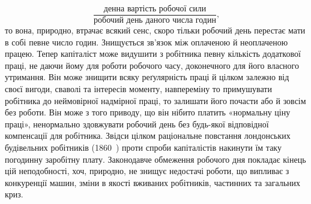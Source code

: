 \[
\frac{\text{денна вартість робочої сили}}{\text{робочий день даного числа годин}}
\text{,}
\]
\noindent{}то вона, природно, втрачає всякий сенс, скоро тільки робочий
день перестає мати в собі певне число годин. Знищується зв’язок
між оплаченою й неоплаченою працею. Тепер капіталіст може
видушити з робітника певну кількість додаткової праці, не даючи
йому для роботи робочого часу, доконечного для його власного
утримання. Він може знищити всяку реґулярність праці й цілком
залежно від своєї вигоди, сваволі та інтересів моменту, навпереміну
то примушувати робітника до неймовірної надмірної
праці, то залишати його почасти або й зовсім без роботи. Він
може з того приводу, що він нібито платить «нормальну ціну
праці», ненормально здовжувати робочий день без будь-якої відповідної
компенсації для робітника. Звідси цілком раціональне
повстання лондонських будівельних робітників (1860~) проти
спроби капіталістів накинути їм таку погодинну заробітну плату.
Законодавче обмеження робочого дня покладає кінець цій неподобності,
хоч, природно, не знищує недостачі роботи, що випливає
з конкуренції машин, зміни в якості вживаних робітників,
частинних та загальних криз.

